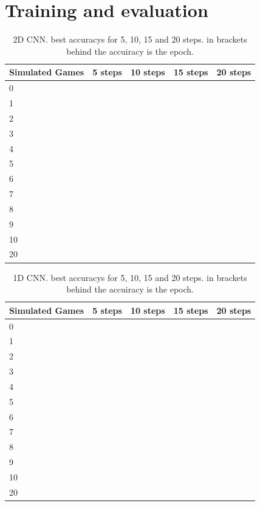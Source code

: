 
\section{Training and evaluation}

\begin{table}[H]
	\centering
	\caption{2D CNN. best accuracys for 5, 10, 15 and 20 steps. in brackets behind the accuiracy is the epoch.}%
	\begin{tabular}{|l|l|l|l|l|}
		\hline
		Simulated Games & 5 steps & 10 steps & 15 steps& 20 steps\\
		\hline
		0 &   & && \\
		1 &  & && \\
		2 &  & && \\
		3 &  & && \\
		4 &  & && \\
		5 & &&& \\
		6 &  & && \\
		7 &  & && \\
		8 &  & && \\
		9 &  & && \\
		10 & &&& \\
		20 & &&& \\
		\hline
	\end{tabular}
\end{table}

\begin{table}[H]
	\centering
	\caption{1D CNN. best accuracys for 5, 10, 15 and 20 steps. in brackets behind the accuiracy is the epoch.}%
	\begin{tabular}{|l|l|l|l|l|}
		\hline
		Simulated Games & 5 steps & 10 steps & 15 steps& 20 steps\\
		\hline
		0 &   & && \\
		1 &  & && \\
		2 &  & && \\
		3 &  & && \\
		4 &  & && \\
		5 & &&& \\
		6 &  & && \\
		7 &  & && \\
		8 &  & && \\
		9 &  & && \\
		10 & &&& \\
		20 & &&& \\
		\hline
	\end{tabular}
\end{table}

